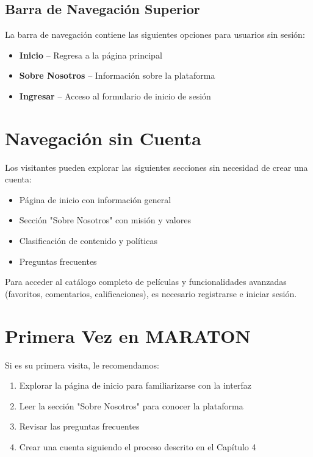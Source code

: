 \documentclass[11pt,a4paper,twoside]{book}
\begin{document}
\subsection{Barra de Navegación Superior}

La barra de navegación contiene las siguientes opciones para usuarios sin sesión:

\begin{itemize}
    \item \textbf{Inicio} -- Regresa a la página principal
    \item \textbf{Sobre Nosotros} -- Información sobre la plataforma
    \item \textbf{Ingresar} -- Acceso al formulario de inicio de sesión
\end{itemize}

\section{Navegación sin Cuenta}

Los visitantes pueden explorar las siguientes secciones sin necesidad de crear una cuenta:

\begin{itemize}
    \item Página de inicio con información general
    \item Sección "Sobre Nosotros" con misión y valores
    \item Clasificación de contenido y políticas
    \item Preguntas frecuentes
\end{itemize}

\begin{warningbox}
Para acceder al catálogo completo de películas y funcionalidades avanzadas (favoritos, comentarios, calificaciones), es necesario registrarse e iniciar sesión.
\end{warningbox}

\section{Primera Vez en MARATON}

Si es su primera visita, le recomendamos:

\begin{enumerate}
    \item Explorar la página de inicio para familiarizarse con la interfaz
    \item Leer la sección "Sobre Nosotros" para conocer la plataforma
    \item Revisar las preguntas frecuentes
    \item Crear una cuenta siguiendo el proceso descrito en el Capítulo 4
\end{enumerate}
\end{document}
